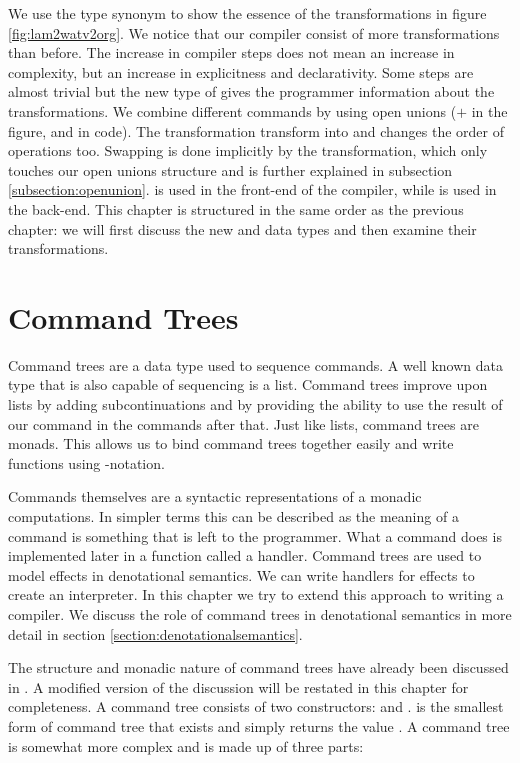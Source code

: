 We use the type synonym  to show the essence of the transformations in figure \ref{fig:lam2watv2org}. We notice that our compiler consist of more transformations than before. The increase in compiler steps does not mean an increase in complexity, but an increase in explicitness and declarativity. Some steps are almost trivial but the new type of  gives the programmer information about the transformations. We combine different commands by using open unions ($+$ in the figure, and \icode{:+:} in code). The  transformation transform  into  and changes the order of operations too. Swapping is done implicitly by the  transformation, which only touches our open unions structure and is further explained in subsection \ref{subsection:openunion}.  is used in the front-end of the compiler, while  is used in the back-end. This chapter is structured in the same order as the previous chapter: we will first discuss the new  and  data types and then examine their transformations.

\section{\label{section:commandtree}Command Trees}
Command trees are a data type used to sequence commands. A well known data type that is also capable of sequencing is a list. Command trees improve upon lists by adding subcontinuations and by providing the ability to use the result of our command in the commands after that. Just like lists, command trees are monads. This allows us to bind command trees together easily and write functions using -notation.

Commands themselves are a syntactic representations of a monadic computations. In simpler terms this can be described as the meaning of a command is something that is left to the programmer. What a command does is implemented later in a function called a handler. Command trees are used to model effects in denotational semantics. We can write handlers for effects to create an interpreter. In this chapter we try to extend this approach to writing a compiler. We discuss the role of command trees in denotational semantics in more detail in section \ref{section:denotationalsemantics}.

The structure and monadic nature of command trees have already been discussed in  \autocite{commandtreespoulsen}. A modified version of the discussion will be restated in this chapter for completeness. A command tree consists of two constructors:  and .  is the smallest form of command tree that exists and simply returns the value . A  command tree is somewhat more complex and is made up of three parts:

